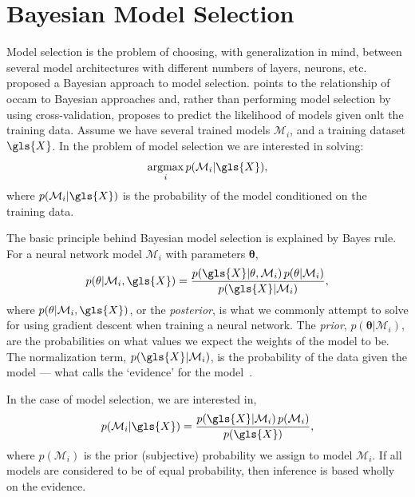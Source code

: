 \documentclass[thesis]{subfiles}
\begin{document}
\section{Bayesian Model Selection}
Model selection is the problem of choosing, with generalization in mind, between several model architectures with different numbers of layers, neurons, etc. 
\citet{mackay1992practical} proposed a Bayesian approach to model selection. \citeauthor{mackay1992practical} points to the relationship of \gls{occam} to Bayesian approaches and, rather than performing model selection by using cross-validation, \citeauthor{mackay1992practical} proposes to predict the likelihood of models given onlt the training data. Assume we have several trained models $\mathcal{M}_i$, and a training dataset $\gls{X}$. In the problem of model selection we are interested in solving:
\begin{equation}
	\argmax_i p(\mathcal{M}_i|\gls{X}),
\end{equation}
where $p(\mathcal{M}_i|\gls{X})$ is the probability of the model conditioned on the training data.

The basic principle behind Bayesian model selection is explained by Bayes rule. For a neural network model $\mathcal{M}_i$ with parameters $\mathbf{\theta}$,
\begin{equation}
	p(\mathbf{\theta}|\mathcal{M}_i,\gls{X}) = \frac{p(\gls{X}|\mathbf{\theta},\mathcal{M}_i)\,p(\mathbf{\theta}|\mathcal{M}_i)}{p(\gls{X}|\mathcal{M}_i)},
\end{equation}
where $p(\mathbf{\theta}|\mathcal{M}_i,\gls{X})$, or the \emph{posterior}, is what we commonly attempt to solve for using gradient descent when training a neural network.
The \emph{prior}, $p(\mathbf{\theta}|\mathcal{M}_i)$, are the probabilities on what values we expect the weights of the model to be. The normalization term, $p(\gls{X}|\mathcal{M}_i)$, is the probability of the data given the model --- what \citeauthor{mackay1992practical} calls the `evidence' for the model~\citep{mackay1995}.

In the case of model selection, we are interested in,
\begin{equation}
	p(\mathcal{M}_i|\gls{X}) = \frac{p(\gls{X}|\mathcal{M}_i)\,p(\mathcal{M}_i)}{p(\gls{X})},
\end{equation}
where $p(\mathcal{M}_i)$ is the prior (subjective) probability we assign to model $\mathcal{M}_i$. If all models are considered to be of equal probability, then inference is based wholly on the evidence.
\end{document}
